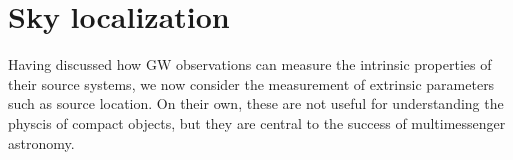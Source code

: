 \section{Sky localization}

Having discussed how GW observations can measure the intrinsic properties of their source systems, we now consider the measurement of extrinsic parameters such as source location. On their own, these are not useful for understanding the physcis of compact objects, but they are central to the success of multimessenger astronomy.

